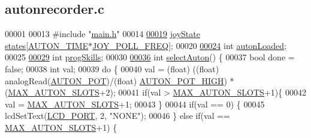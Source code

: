\hypertarget{autonrecorder_8c_source}{}\subsection{autonrecorder.\+c}
\label{autonrecorder_8c_source}

\begin{DoxyCode}
00001 
00013 \textcolor{preprocessor}{#include "\hyperlink{main_8h}{main.h}"}
00014 
\hypertarget{autonrecorder_8c_source.tex_l00019}{}\hyperlink{autonrecorder_8h_a904e0a0d44a852a7df1122a3c7fecdef}{00019} \hyperlink{structjoy_state}{joyState} \hyperlink{autonrecorder_8c_a904e0a0d44a852a7df1122a3c7fecdef}{states}[\hyperlink{autonrecorder_8h_aa19f7c427989a0a67f55958c610d0355}{AUTON\_TIME}*\hyperlink{autonrecorder_8h_a3d2260a30e7ce727bef0402edee4b205}{JOY\_POLL\_FREQ}];
00020 
\hypertarget{autonrecorder_8c_source.tex_l00024}{}\hyperlink{autonrecorder_8h_a4e72d907ee74449b71b5e20943f4217e}{00024} \textcolor{keywordtype}{int} \hyperlink{autonrecorder_8c_a4e72d907ee74449b71b5e20943f4217e}{autonLoaded};
00025 
\hypertarget{autonrecorder_8c_source.tex_l00029}{}\hyperlink{autonrecorder_8h_aa2eda471576bdbaf33835a71da9bc616}{00029} \textcolor{keywordtype}{int} \hyperlink{autonrecorder_8c_aa2eda471576bdbaf33835a71da9bc616}{progSkills};
00030 
\hypertarget{autonrecorder_8c_source.tex_l00036}{}\hyperlink{autonrecorder_8c_a7233586e332461dc25c7cc950a08d429}{00036} \textcolor{keywordtype}{int} \hyperlink{autonrecorder_8c_a7233586e332461dc25c7cc950a08d429}{selectAuton}() \{
00037     \textcolor{keywordtype}{bool} done = \textcolor{keyword}{false};
00038     \textcolor{keywordtype}{int} val;
00039     \textcolor{keywordflow}{do} \{
00040         val = (float) ((\textcolor{keywordtype}{float}) analogRead(\hyperlink{autonrecorder_8h_a2490cda7a399f481333af2e5589b74a9}{AUTON\_POT})/(float) 
      \hyperlink{autonrecorder_8h_a01989d89b8bed150d0aacdaef5ccabd3}{AUTON\_POT\_HIGH}) * (\hyperlink{autonrecorder_8h_a5173a11a545cb4020fdd139552dc15c1}{MAX\_AUTON\_SLOTS}+2);
00041         \textcolor{keywordflow}{if}(val > \hyperlink{autonrecorder_8h_a5173a11a545cb4020fdd139552dc15c1}{MAX\_AUTON\_SLOTS}+1)\{
00042             val = \hyperlink{autonrecorder_8h_a5173a11a545cb4020fdd139552dc15c1}{MAX\_AUTON\_SLOTS}+1;
00043         \}
00044         \textcolor{keywordflow}{if}(val == 0) \{
00045             lcdSetText(\hyperlink{lcdmsg_8h_abcf42bd88b3c36193f301ca25b033875}{LCD\_PORT}, 2, \textcolor{stringliteral}{"NONE"});
00046         \} \textcolor{keywordflow}{else} \textcolor{keywordflow}{if}(val == \hyperlink{autonrecorder_8h_a5173a11a545cb4020fdd139552dc15c1}{MAX\_AUTON\_SLOTS}+1) \{

\end{DoxyCode}
